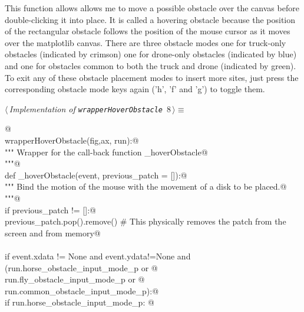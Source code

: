 \documentclass[11.5pt]{report}
\begin{document}
This function allows allows me to move a possible obstacle over the canvas before double-clicking it into place. It is called a hovering obstacle because
the position of the rectangular obstacle follows the position of the mouse cursor as it moves over the matplotlib canvas. There are three obstacle modes
one for truck-only obstacles (indicated by crimson) one for drone-only obstacles (indicated by blue) and one for obstacles common to both the truck and 
drone (indicated by green). To exit any of these obstacle placement modes to insert more sites, just press the corresponding obstacle mode keys again 
('h', 'f' and 'g') to toggle them. 

\begin{flushleft} \small\label{scrap8}\raggedright\small
{} $\langle\,${\itshape Implementation of \verb|wrapperHoverObstacle|}\nobreak\ {\footnotesize {8}}$\,\rangle\equiv$
\vspace{-1ex}
\begin{list}{}{} \item
\mbox{}\verb@   @\\
\mbox{}\verb@def wrapperHoverObstacle(fig,ax, run):@\\
\mbox{}\verb@        """ Wrapper for the call-back function _hoverObstacle@\\
\mbox{}\verb@        """@\\
\mbox{}\verb@        def _hoverObstacle(event, previous_patch = []):@\\
\mbox{}\verb@          """ Bind the motion of the mouse with the movement of a disk to be placed.@\\
\mbox{}\verb@          """@\\
\mbox{}\verb@          if previous_patch != []:@\\
\mbox{}\verb@              previous_patch.pop().remove() # This physically removes the patch from the screen and from memory@\\
\mbox{}\verb@@\\
\mbox{}\verb@          if event.xdata != None and event.ydata!=None and (run.horse_obstacle_input_mode_p  or @\\
\mbox{}\verb@                                                            run.fly_obstacle_input_mode_p    or @\\
\mbox{}\verb@                                                            run.common_obstacle_input_mode_p):@\\
\mbox{}\verb@              if run.horse_obstacle_input_mode_p: @\\

\end{list}
\end{flushleft}
\end{document}
